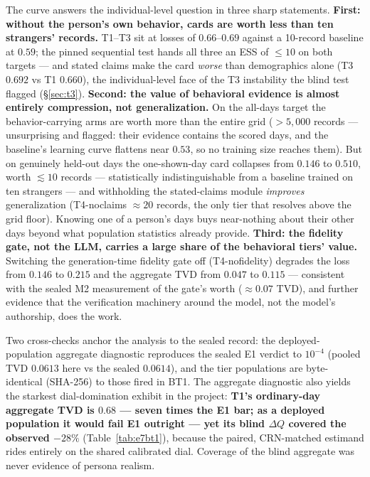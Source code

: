 \documentclass[11pt]{article}
\newcommand{\dq}{\Delta Q}
\begin{document}
The curve answers the individual-level question in three sharp
statements. \textbf{First: without the person's own behavior, cards
are worth less than ten strangers' records.} T1--T3 sit at losses of
$0.66$--$0.69$ against a 10-record baseline at $0.59$; the pinned
sequential test hands all three an ESS of $\leq 10$ on both targets ---
and stated claims make the card \emph{worse} than demographics alone
(T3 $0.692$ vs T1 $0.660$), the individual-level face of the T3
instability the blind test flagged (\S\ref{sec:t3}).
\textbf{Second: the value of behavioral evidence is almost entirely
compression, not generalization.} On the all-days target the
behavior-carrying arms are worth more than the entire grid ($>5{,}000$
records --- unsurprising and flagged: their evidence contains the
scored days, and the baseline's learning curve flattens near $0.53$,
so no training size reaches them). But on genuinely held-out days the
one-shown-day card collapses from $0.146$ to $0.510$, worth
$\lesssim 10$ records --- statistically indistinguishable from a
baseline trained on ten strangers --- and withholding the stated-claims
module \emph{improves} generalization (T4-noclaims $\approx 20$
records, the only tier that resolves above the grid floor). Knowing
one of a person's days buys near-nothing about their other days beyond
what population statistics already provide.
\textbf{Third: the fidelity gate, not the LLM, carries a large share
of the behavioral tiers' value.} Switching the generation-time
fidelity gate off (T4-nofidelity) degrades the loss from $0.146$ to
$0.215$ and the aggregate TVD from $0.047$ to $0.115$ --- consistent
with the sealed M2 measurement of the gate's worth ($\approx 0.07$
TVD), and further evidence that the verification machinery around the
model, not the model's authorship, does the work.

Two cross-checks anchor the analysis to the sealed record: the
deployed-population aggregate diagnostic reproduces the sealed E1
verdict to $10^{-4}$ (pooled TVD $0.0613$ here vs the sealed
$0.0614$), and the tier populations are byte-identical (SHA-256) to
those fired in BT1. The aggregate diagnostic also yields the starkest
dial-domination exhibit in the project: \textbf{T1's ordinary-day
aggregate TVD is $0.68$ --- seven times the E1 bar; as a deployed
population it would fail E1 outright --- yet its blind $\dq$ covered
the observed $-28\%$} (Table~\ref{tab:e7bt1}), because the paired,
CRN-matched estimand rides entirely on the shared calibrated dial.
Coverage of the blind aggregate was never evidence of persona realism.
\end{document}
